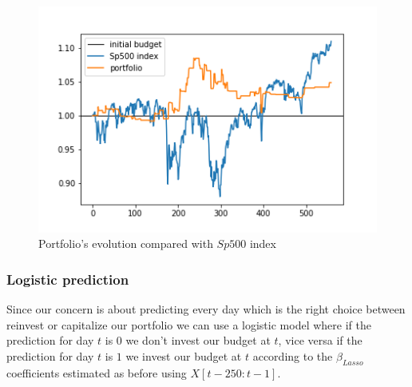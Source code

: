 \documentclass{article}%
\begin{document}
    \begin{figure}[h!]
  \centering
  \includegraphics[scale=0.6]{act_portfolio.png}
  \caption{Portfolio's evolution compared with $Sp500$ index}
  \label{portfolio_alpha}
  \end{figure}

\subsubsection{Logistic prediction}
Since our concern is about predicting every day which is the right choice between reinvest or capitalize our portfolio we can use a logistic model where if the prediction for day $t$ is $0$ we don't invest our budget at $t$, vice versa if the prediction for day $t$ is $1$ we invest our budget at $t$ according to the $\beta_{Lasso}$ coefficients estimated as before using $X[t-250:t-1]$.
\end{document}
